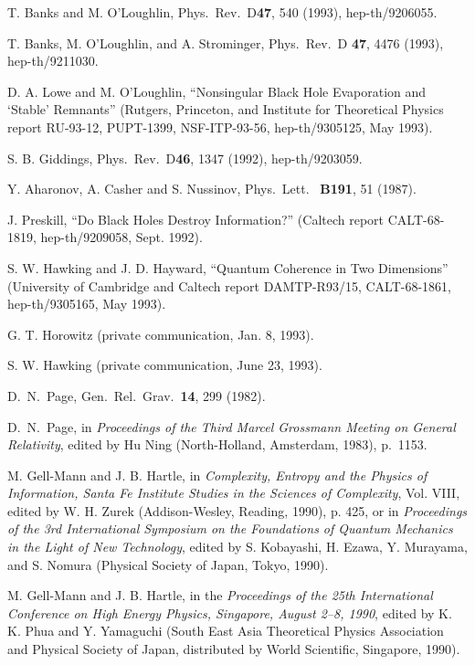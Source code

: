 \documentclass[12pt]{article}
\begin{document}
\begin{thebibliography}{999}
 T. Banks and M. O'Loughlin,  Phys.\ Rev.\ D{\bf 47},
540
(1993),
hep-th/9206055.

 T. Banks, M. O'Loughlin, and A. Strominger, Phys.\
Rev.\ D
{\bf 47}, 4476 (1993), hep-th/9211030.

 D. A. Lowe and M. O'Loughlin, ``Nonsingular Black Hole
Evaporation and `Stable' Remnants''
(Rutgers, Princeton, and Institute for Theoretical Physics report
RU-93-12, PUPT-1399, NSF-ITP-93-56, hep-th/9305125, May 1993).

 S. B. Giddings,  Phys.\ Rev.\ D{\bf46}, 1347 (1992),
hep-th/9203059.

 Y. Aharonov, A. Casher and S. Nussinov,  Phys.\ Lett.\
{\bf
B191}, 51 (1987).

 J. Preskill, ``Do Black Holes Destroy Information?''
(Caltech
report CALT-68-1819, hep-th/9209058, Sept. 1992).

 S. W. Hawking and J. D. Hayward, ``Quantum Coherence
in Two Dimensions'' (University of Cambridge and Caltech report
DAMTP-R93/15, CALT-68-1861, hep-th/9305165, May 1993).

 G. T. Horowitz (private communication, Jan. 8,
1993).

 S. W. Hawking (private communication, June 23,
1993).

 D.\ N.\ Page, Gen.\ Rel.\ Grav.\ {\bf 14}, 299
(1982).

 D.\ N.\ Page, in {\em Proceedings of the Third Marcel
Grossmann
Meeting on General Relativity}, edited by Hu Ning (North-Holland,
Amsterdam,
1983), p.~1153.

 M. Gell-Mann and J. B. Hartle, in {\em
Complexity, Entropy and the Physics of Information, Santa
Fe Institute Studies in the Sciences of Complexity}, Vol. VIII,
edited by W. H. Zurek (Addison-Wesley, Reading, 1990), p.
425, or in {\em Proceedings of the 3rd International
Symposium on the Foundations of Quantum Mechanics in
the Light of New Technology}, edited by S. Kobayashi, H.
Ezawa, Y. Murayama, and S. Nomura (Physical Society of
Japan, Tokyo, 1990).

 M. Gell-Mann and J. B. Hartle, in the {\em
Proceedings of the 25th International Conference on High
Energy Physics, Singapore, August 2--8, 1990}, edited by K.
K. Phua and Y. Yamaguchi (South East Asia Theoretical
Physics Association and Physical Society of Japan,
distributed by World Scientific, Singapore, 1990).


\end{thebibliography}
\end{document}
